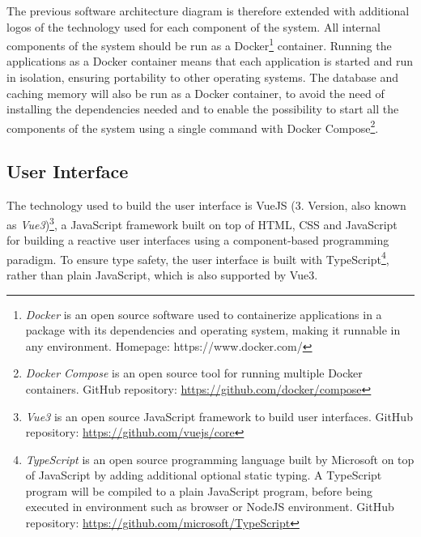 The previous software architecture diagram is therefore extended with additional logos of the technology used for each component of the system. All internal components of the system should be run as a Docker\footnote{\emph{Docker} is an open source software used to containerize applications in a package with its dependencies and operating system, making it runnable in any environment. Homepage: https://www.docker.com/} container. Running the applications as a Docker container means that each application is started and run in isolation, ensuring portability to other operating systems. The database and caching memory will also be run as a Docker container, to avoid the need of installing the dependencies needed and to enable the possibility to start all the components of the system using a single command with Docker Compose\footnote{\emph{Docker Compose} is an open source tool for running multiple Docker containers. GitHub repository: \url{https://github.com/docker/compose}}.

\subsection{User Interface}
The technology used to build the user interface is VueJS (3. Version, also known as \emph{Vue3})\footnote{\emph{Vue3} is an open source JavaScript framework to build user interfaces. GitHub repository: \url{https://github.com/vuejs/core}}, a JavaScript framework built on top of HTML, CSS and JavaScript for building a reactive user interfaces using a component-based programming paradigm. To ensure type safety, the user interface is built with TypeScript\footnote{\emph{TypeScript} is an open source programming language built by Microsoft on top of JavaScript by adding additional optional static typing. A TypeScript program will be compiled to a plain JavaScript program, before being executed in environment such as browser or NodeJS environment. GitHub repository: \url{https://github.com/microsoft/TypeScript}}, rather than plain JavaScript, which is also supported by Vue3.

